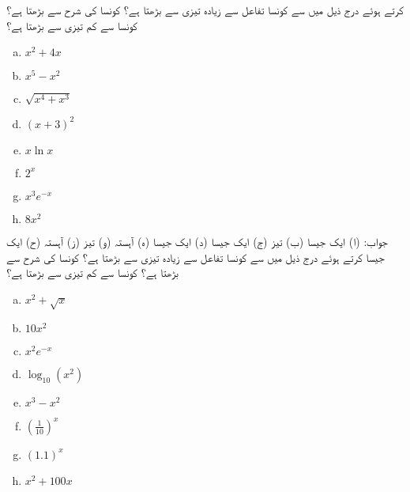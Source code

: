  کرتے ہوئے درج ذیل میں سے کونسا تفاعل  سے زیادہ تیزی سے بڑھتا ہے؟ کونسا  کی شرح سے بڑھتا ہے؟  کونسا  سے کم تیزی سے بڑھتا ہے؟
\begin{multicols}{4}
\begin{enumerate}[a.]
\item
$x^2+4x$
\item
$x^5-x^2$
\item
$\sqrt{x^4+x^3}$
\item
$(x+3)^2$
\item
$x\ln x$
\item
$2^x$
\item
$x^3e^{-x}$
\item
$8x^2$
\end{enumerate}
\end{multicols}
جواب:\quad
(ا) ایک جیسا (ب) تیز (ج) ایک جیسا (د) ایک جیسا (ہ) آہستہ (و) تیز (ز) آہستہ (ح) ایک جیسا 
 کرتے ہوئے درج ذیل میں سے کونسا تفاعل  سے زیادہ تیزی سے بڑھتا ہے؟ کونسا  کی شرح سے بڑھتا ہے؟  کونسا  سے کم تیزی سے بڑھتا ہے؟
\begin{multicols}{4}
\begin{enumerate}[a.]
\item
$x^2+\sqrt{x}$
\item
$10x^2$
\item
$x^2e^{-x}$
\item
$\log_{10}(x^2)$
\item
$x^3-x^2$
\item
$(\tfrac{1}{10})^x$
\item
$(1.1)^x$
\item
$x^2+100x$
\end{enumerate}
\end{multicols}

